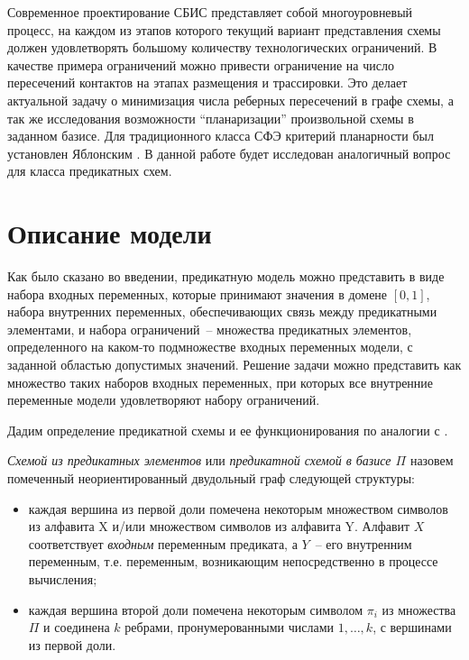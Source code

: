 \documentclass[12pt]{extarticle}
\newenvironment{definition}[1][Определение.]{\begin{trivlist}
\item[\hskip \labelsep {\bfseries #1}]}{\end{trivlist}}
\begin{document}
Современное проектирование СБИС представляет собой многоуровневый процесс, на каждом из этапов которого
текущий вариант представления схемы должен удовлетворять большому количеству технологических ограничений. 
В качестве примера ограничений можно привести ограничение на число пересечений контактов на этапах размещения и трассировки.
Это делает актуальной задачу о минимизация числа реберных пересечений в графе схемы, а так же исследования
возможности ``планаризации'' произвольной схемы в заданном базисе. Для традиционного класса СФЭ критерий планарности
был установлен Яблонским \cite{yabl_planar}. В данной работе будет исследован аналогичный вопрос для класса предикатных схем.

\clearpage
\section{Описание модели}

Как было сказано во введении, предикатную модель можно представить в виде набора входных переменных,
которые принимают значения в домене $[0, 1]$, набора внутренних переменных, 
обеспечивающих связь между предикатными элементами, и набора ограничений~-- множества
предикатных элементов, определенного на каком-то подмножестве входных переменных модели, 
с заданной областью допустимых значений.
Решение задачи можно представить как множество таких наборов входных переменных, при которых все внутренние
переменные модели удовлетворяют набору ограничений.

Дадим определение предикатной схемы и ее функционирования по аналогии с \cite{Shu11}.

\begin{definition}
\label{pred_def}
\textit{Схемой из предикатных элементов} или \textit{предикатной схемой в базисе $\Pi$} назовем помеченный
неориентированный двудольный граф следующей структуры:

\begin{itemize}
\item каждая вершина из первой доли помечена некоторым множеством символов из алфавита X и/или 
множеством символов из алфавита Y. 
Алфавит $X$ соответствует \textit{входным} переменным предиката, а $Y$~-- его внутренним переменным, 
т.е. переменным, возникающим непосредственно в процессе вычисления; 

\item каждая вершина второй доли помечена некоторым символом $\pi_i$ из множества $\Pi$ и 
соединена $k$ ребрами, пронумерованными числами $1, \dots, k$, с вершинами из первой доли.
\end{itemize}
\end{definition}
\end{document}
